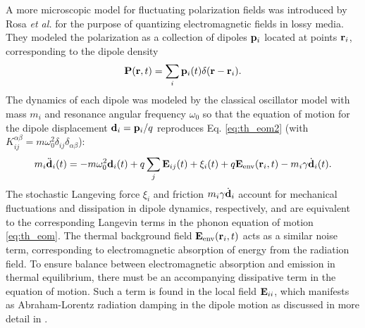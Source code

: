 A more microscopic model for fluctuating polarization fields was introduced by Rosa \textit{et al.} \cite{rosa10,rosa11} for the purpose of quantizing electromagnetic fields in lossy media. They modeled the polarization as a collection of dipoles $\mathbf{p}_i$ located at points $\mathbf{r}_i$, corresponding to the dipole density
\begin{equation}
 \mathbf{P}(\mathbf{r},t) = \sum_i \mathbf{p}_i(t) \delta(\mathbf{r}-\mathbf{r}_i).
\end{equation}
The dynamics of each dipole was modeled by the classical oscillator model with mass $m_i$ and resonance angular frequency $\omega_0$ so that the equation of motion for the dipole displacement $\mathbf{d}_i=\mathbf{p}_i/q$ reproduces Eq. \eqref{eq:th_eom2} (with $K_{ij}^{\alpha\beta}=m\omega_0^2\delta_{ij}\delta_{\alpha\beta}$): \cite{rosa10,rosa11}
\begin{equation}
 m_i \ddot{\mathbf{d}}_i(t) = - m \omega_0^2 \mathbf{d}_i(t) +q\sum_{j} \mathbf{E}_{ij}(t)+\xi_i(t)+ q\mathbf{E}_{\textrm{env}}(\mathbf{r}_i,t) - m_i \gamma \dot{\mathbf{d}}_i(t). \label{eq:th_eom2b}
\end{equation}
The stochastic Langeving force $\xi_i$ and friction $m_i\gamma \dot{\mathbf{d}}_i$ account for mechanical fluctuations and dissipation in dipole dynamics, respectively, and are equivalent to the corresponding Langevin terms in the phonon equation of motion \eqref{eq:th_eom}. The thermal background field $\mathbf{E}_{\textrm{env}}(\mathbf{r}_i,t)$ acts as a similar noise term, corresponding to electromagnetic absorption of energy from the radiation field. To ensure balance between electromagnetic absorption and emission in thermal equilibrium, there must be an accompanying dissipative term in the equation of motion. Such a term is found in the local field $\mathbf{E}_{ii}$, which manifests as Abraham-Lorentz radiation damping in the dipole motion \cite{jackson} as discussed in more detail in . 

